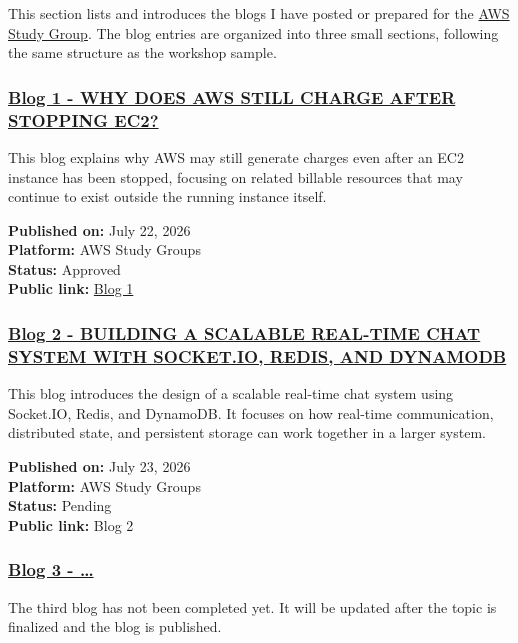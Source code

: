 This section lists and introduces the blogs I have posted or prepared
for the \href{https://www.facebook.com/groups/awsstudygroupfcj}{AWS
Study Group}. The blog entries are organized into three small sections,
following the same structure as the workshop sample.

\subsubsection{\texorpdfstring{\href{3.1-Blog1/}{Blog 1 - WHY DOES AWS
STILL CHARGE AFTER STOPPING
EC2?}}{Blog 1 - WHY DOES AWS STILL CHARGE AFTER STOPPING EC2?}}

This blog explains why AWS may still generate charges even after an EC2
instance has been stopped, focusing on related billable resources that
may continue to exist outside the running instance itself.

\textbf{Published on:} July 22, 2026\\
\textbf{Platform:} AWS Study Groups\\
\textbf{Status:} Approved\\
\textbf{Public link:}
\href{https://www.facebook.com/groups/awsstudygroupfcj/permalink/2219932025438424/?rdid=SGRgenG5JS3UR6Y0\#}{Blog
1}

\subsubsection{\texorpdfstring{\href{3.2-Blog2/}{Blog 2 - BUILDING A
SCALABLE REAL-TIME CHAT SYSTEM WITH SOCKET.IO, REDIS, AND
DYNAMODB}}{Blog 2 - BUILDING A SCALABLE REAL-TIME CHAT SYSTEM WITH SOCKET.IO, REDIS, AND DYNAMODB}}

This blog introduces the design of a scalable real-time chat system
using Socket.IO, Redis, and DynamoDB. It focuses on how real-time
communication, distributed state, and persistent storage can work
together in a larger system.

\textbf{Published on:} July 23, 2026\\
\textbf{Platform:} AWS Study Groups\\
\textbf{Status:} Pending\\
\textbf{Public link:} Blog 2

\subsubsection{\texorpdfstring{\href{3.3-Blog3/}{Blog 3 -
\ldots{}}}{Blog 3 - \ldots{}}}

The third blog has not been completed yet. It will be updated after the
topic is finalized and the blog is published.
